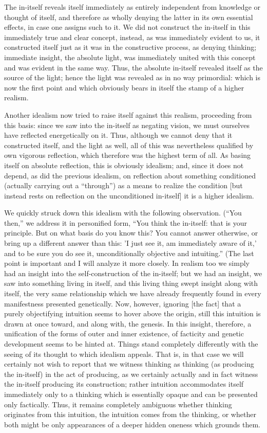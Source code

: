 The in-itself reveals itself immediately
as entirely independent from knowledge or thought of itself,
and therefore as wholly denying the latter
in its own essential effects, in case one assigns such to it.
We did not construct the in-itself
in this immediately true and clear concept,
instead, as was immediately evident to us,
it constructed itself just as it was
in the constructive process, as denying thinking;
immediate insight, the absolute light, was
immediately united with this concept
and was evident in the same way.
Thus, the absolute in-itself revealed itself
as the source of the light;
hence the light was revealed
as in no way primordial:
which is now the first point
and which obviously bears in itself
the stamp of a higher realism.

Another idealism now tried to raise itself
against this realism, proceeding from this basis:
since we saw into the in-itself as negating vision,
we must ourselves have reflected energetically on it.
Thus, although we cannot deny that it constructed itself,
and the light as well, all of this was nevertheless
qualified by own vigorous reflection,
which therefore was the highest term of all.
As basing itself on absolute reflection,
this is obviously idealism;
and, since it does not depend,
as did the previous idealism,
on reflection about something conditioned
(actually carrying out a “through”)
as a means to realize the condition
[but instead rests on reflection
on the unconditioned in-itself]
it is a higher idealism.

We quickly struck down this idealism
with the following observation.
(“You then,” we address it in personified form,
“You think the in-itself: that is your principle.
But on what basis do you know this?
You cannot answer otherwise,
or bring up a different answer than this:
'I just see it, am immediately aware of it,'
and to be sure you do see it,
unconditionally objective and intuiting.”
(The last point is important and I will analyze it more closely.
In realism too we simply had an insight
into the self-construction of the in-itself;
but we had an insight, we saw into something living in itself,
and this living thing swept insight along with itself,
the very same relationship which we have already frequently found
in every manifestness presented genetically.
Now, however, ignoring [the fact] that
a purely objectifying intuition seems
to hover above the origin,
still this intuition is drawn at once toward,
and along with, the genesis.
In this insight, therefore,
a unification of the forms
of outer and inner existence,
of facticity and genetic development
seems to be hinted at.
Things stand completely differently with the seeing of
its thought to which idealism appeals.
That is, in that case we will certainly
not wish to report that we witness thinking as thinking
(as producing the in-itself)
in the act of producing,
as we certainly actually and in fact witness
the in-itself producing its construction;
rather intuition accommodates itself immediately only to
a thinking which is essentially opaque
and can be presented only factically.
Thus, it remains completely ambiguous
whether thinking originates from this intuition,
the intuition comes from the thinking,
or whether both might be only appearances
of a deeper hidden oneness which grounds them.

